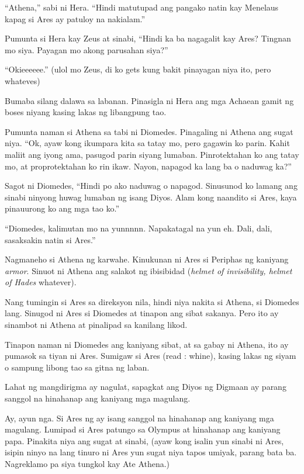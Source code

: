 \documentclass[12pt,letterpaper]{report}
\begin{document}
``Athena,'' sabi ni Hera. ``Hindi matutupad ang pangako natin kay Menelaus kapag si Ares ay patuloy na nakialam.''

Pumunta si Hera kay Zeus at sinabi, ``Hindi ka ba nagagalit kay Ares? Tingnan mo siya. Payagan mo akong parusahan siya?''

``Okieeeeee.'' (ulol mo Zeus, di ko gets kung bakit pinayagan niya ito, pero whateves)

Bumaba silang dalawa sa labanan. Pinasigla ni Hera ang mga Achaean gamit ng boses niyang kasing lakas ng libangpung tao.

Pumunta naman si Athena sa tabi ni Diomedes. Pinagaling ni Athena ang sugat niya. ``Ok, ayaw kong ikumpara kita sa tatay mo, pero gagawin ko parin. Kahit maliit ang iyong ama, pasugod parin siyang lumaban. Pinrotektahan ko ang tatay mo, at proprotektahan ko rin ikaw. Nayon, napagod ka lang ba o naduwag ka?''

Sagot ni Diomedes, ``Hindi po ako naduwag o napagod. Sinusunod ko lamang ang sinabi ninyong huwag lumaban ng isang Diyos. Alam kong naandito si Ares, kaya pinauurong ko ang mga tao ko.''

``Diomedes, kalimutan mo na yunnnnn. Napakatagal na yun eh. Dali, dali, sasaksakin natin si Ares.''

Nagmaneho si Athena ng karwahe. Kinukunan ni Ares si Periphas ng kaniyang \textit{armor}. Sinuot ni Athena ang salakot ng ibisibidad (\textit{helmet of invisibility, helmet of Hades} whatever).

Nang tumingin si Ares sa direksyon nila, hindi niya nakita si Athena, si Diomedes lang. Sinugod ni Ares si Diomedes at tinapon ang sibat sakanya. Pero ito ay sinambot ni Athena at pinalipad sa kanilang likod.

Tinapon naman ni Diomedes ang kaniyang sibat, at sa gabay ni Athena, ito ay pumasok sa tiyan ni Ares. Sumigaw si Ares (read : whine), kasing lakas ng siyam o sampung libong tao sa gitna ng laban.

Lahat ng mangdirigma ay nagulat, sapagkat ang Diyos ng Digmaan ay parang sanggol na hinahanap ang kaniyang mga magulang.

Ay, ayun nga. Si Ares ng ay isang sanggol na hinahanap ang kaniyang mga magulang. Lumipad si Ares patungo sa Olympus at hinahanap ang kaniyang papa. Pinakita niya ang sugat at sinabi, (ayaw kong isalin yun sinabi ni Ares, isipin ninyo na lang tinuro ni Ares yun sugat niya tapos umiyak, parang bata ba. Nagreklamo pa siya tungkol kay Ate Athena.)
\end{document}

